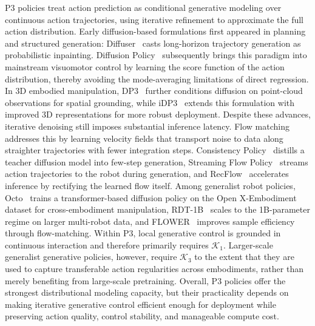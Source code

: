 \documentclass[acmsmall,screen,review]{acmart}
\begin{document}
P3 policies treat action prediction as conditional generative modeling over continuous action trajectories, using iterative refinement to approximate the full action distribution.
Early diffusion-based formulations first appeared in planning and structured generation: Diffuser~\cite{janner2022diffuser} casts long-horizon trajectory generation as probabilistic inpainting. 
Diffusion Policy~\cite{chi2023diffusion} subsequently brings this paradigm into mainstream visuomotor control by learning the score function of the action distribution, thereby avoiding the mode-averaging limitations of direct regression. 
In 3D embodied manipulation, DP3~\cite{ze2024diffusion} further conditions diffusion on point-cloud observations for spatial grounding, while iDP3~\cite{liang2024idp3} extends this formulation with improved 3D representations for more robust deployment.
Despite these advances, iterative denoising still imposes substantial inference latency.
Flow matching addresses this by learning velocity fields that transport noise to data along straighter trajectories with fewer integration steps. 
Consistency Policy~\cite{prasad2024consistency} distills a teacher diffusion model into few-step generation, Streaming Flow Policy~\cite{jiang2025streaming} streams action trajectories to the robot during generation, and RecFlow~\cite{xue2025recflow} accelerates inference by rectifying the learned flow itself.
Among generalist robot policies, Octo~\cite{octomodelteam2024} trains a transformer-based diffusion policy on the Open X-Embodiment dataset for cross-embodiment manipulation, RDT-1B~\cite{liu2025rdtb} scales to the 1B-parameter regime on larger multi-robot data, and FLOWER~\cite{reuss2025flower} improves sample efficiency through flow-matching.
Within P3, local generative control is grounded in continuous interaction and therefore primarily requires \(\mathcal{K}_1\). Larger-scale generalist generative policies, however, require \(\mathcal{K}_3\) to the extent that they are used to capture transferable action regularities across embodiments, rather than merely benefiting from large-scale pretraining.
Overall, P3 policies offer the strongest distributional modeling capacity, but their practicality depends on making iterative generative control efficient enough for deployment while preserving action quality, control stability, and manageable compute cost.
\end{document}
